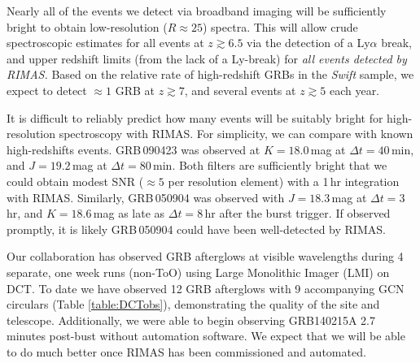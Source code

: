 \documentclass[letterpaper,11pt]{article}
\begin{document}
Nearly all of the events we detect via broadband imaging will be sufficiently 
bright to obtain low-resolution ($R \approx 25$) spectra.  This will allow crude
spectroscopic estimates for all events at $z \gtrsim 6.5$ via the detection of a
Ly$\alpha$ break, and upper redshift limits (from the lack of a Ly-break)
for \textit{all events detected by RIMAS.}  Based on the relative rate of 
high-redshift GRBs in the \textit{Swift} sample\cite{pcb+09,gkk+11}, we expect 
to detect $\approx 1$ GRB at $z \gtrsim 7$, and several events at $z \gtrsim 5$ 
each year. 

It is difficult to reliably predict how many events will be suitably bright 
for high-resolution spectroscopy with RIMAS.  For simplicity, we can compare with known
high-redshifts events.  GRB\,090423\cite{tfl+09} was observed at $K = 18.0$\,mag at
$\Delta t = 40$\,min, and $J = 19.2$\,mag at $\Delta t = 80$\,min.  Both filters are 
sufficiently bright that we could obtain modest SNR ($\approx 5$ per resolution
element) with a 1\,hr integration with RIMAS.  Similarly, GRB\,050904\cite{hnr+05}
was observed with $J = 18.3$\,mag at $\Delta t = 3$\,hr, and $K = 18.6$\,mag as
late as $\Delta t = 8$\,hr after the burst trigger.  If observed promptly, it is likely
GRB\,050904 could have been well-detected by RIMAS.

Our collaboration has observed GRB afterglows at visible wavelengths during 4 separate, one week runs (non-ToO) using Large Monolithic Imager (LMI) on DCT. To date we have observed 12 GRB afterglows with 9 accompanying GCN circulars (Table \ref{table:DCTobs}), demonstrating the quality of the site and telescope. Additionally, we were able to begin observing GRB140215A 2.7 minutes post-bust without automation software.  We expect that we will be able to do much better once RIMAS has been commissioned and automated. \\
\end{document}
